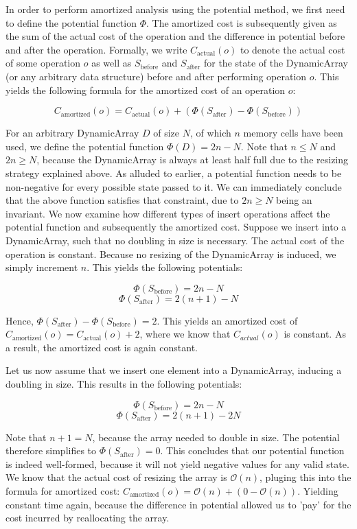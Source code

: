 In order to perform amortized analysis using the potential method, we first need to define the potential function \(\Phi\). The amortized cost is subsequently given as the sum of the actual cost of the operation and the difference in potential before and after the operation. Formally, we write \(C_{\text{actual}}(o)\) to denote the actual cost of some operation \(o\) as well as \(S_{\text{before}}\) and \(S_{\text{after}}\) for the state of the DynamicArray (or any arbitrary data structure) before and after performing operation \(o\). This yields the following formula for the amortized cost of an operation \(o\):

\[C_{\text{amortized}}(o) = C_{\text{actual}}(o) + (\Phi(S_{\text{after}}) - \Phi(S_{\text{before}}))\]
\label{eq:amortized-cost}

For an arbitrary DynamicArray \(D\) of size \(N\), of which \(n\) memory cells have been used,  we define the potential function \(\Phi(D) = 2n - N\). Note that \(n \leq N\) and \(2n \geq N\), because the DynamicArray is always at least half full due to the resizing strategy explained above. 
As alluded to earlier, a potential function needs to be non-negative for every possible state passed to it. We can immediately conclude that the above function satisfies that constraint, due to \(2n \geq N\) being an invariant. We now examine how different types of insert operations affect the potential function and subsequently the amortized cost.
Suppose we insert into a DynamicArray, such that no doubling in size is necessary. The actual cost of the operation is constant. Because no resizing of the DynamicArray is induced, we simply increment \(n\). This yields the following potentials:

\[\Phi(S_{\text{before}}) = 2n - N\]
\[\Phi(S_{\text{after}}) = 2(n + 1) - N\]

Hence, \(\Phi(S_{\text{after}}) - \Phi(S_{\text{before}}) = 2\). This yields an amortized cost of \(C_{\text{amortized}}(o) = C_{\text{actual}}(o) + 2\), where we know that \(C_{actual}(o)\) is constant. As a result, the amortized cost is again constant.

Let us now assume that we insert one element into a DynamicArray, inducing a doubling in size. This results in the following potentials:

\[\Phi(S_{\text{before}}) = 2n - N\]
\[\Phi(S_{\text{after}}) = 2(n + 1) - 2N\]

Note that \(n + 1 = N\), because the array needed to double in size. The potential therefore simplifies to \(\Phi(S_{\text{after}}) = 0\). This concludes that our potential function is indeed well-formed, because it will not yield negative values for any valid state.
We know that the actual cost of resizing the array is \(\mathcal{O}(n)\), pluging this into the formula for amortized cost: \(C_{\text{amortized}}(o) = \mathcal{O}(n) + ( 0 - \mathcal{O}(n))\). Yielding constant time again, because the difference in potential allowed us to 'pay' for the cost incurred by reallocating the array.

